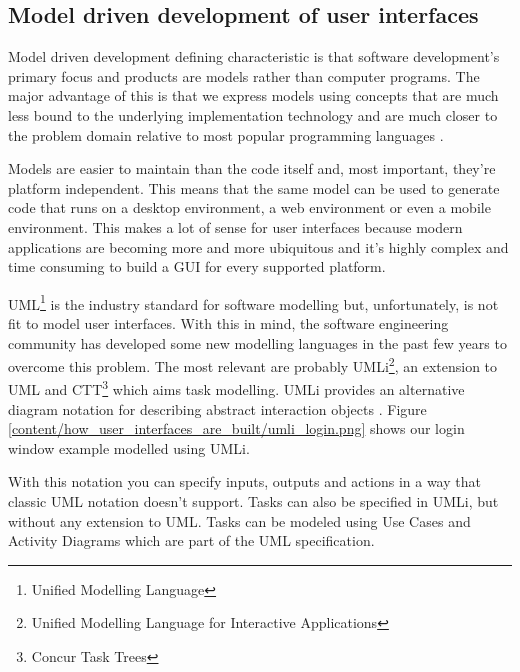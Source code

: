 \subsection{Model driven development of user interfaces}
Model driven development defining characteristic is that software development's primary focus and products are models rather than computer programs. The major advantage of this is that we express models using concepts that are much less bound to the underlying implementation technology and are much closer to the problem domain relative to most popular programming languages \cite{The_Pragmatics_of_Model-Driven_Development}.

Models are easier to maintain than the code itself and, most important, they're platform independent. This means that the same model can be used to generate code that runs on a desktop environment, a web environment or even a mobile environment. This makes a lot of sense for user interfaces because modern applications are becoming more and more ubiquitous and it's highly complex and time consuming to build a GUI for every supported platform.

UML\footnote{Unified Modelling Language} is the industry standard for software modelling but, unfortunately, is not fit to model user interfaces. With this in mind, the software engineering community has developed some new modelling languages in the past few years to overcome this problem. The most relevant are probably UMLi\footnote{Unified Modelling Language for Interactive Applications}, an extension to UML and CTT\footnote{Concur Task Trees} which aims task modelling. UMLi provides an alternative diagram notation for describing abstract interaction objects \cite{User_Interface_Modeling_in_UMLi}. Figure \ref{content/how_user_interfaces_are_built/umli_login.png} shows our login window example modelled using UMLi.

With this notation you can specify inputs, outputs and actions in a way that classic UML notation doesn’t support. Tasks can also be specified in UMLi, but without any extension to UML. Tasks can be modeled using Use Cases and Activity Diagrams which are part of the UML specification.

